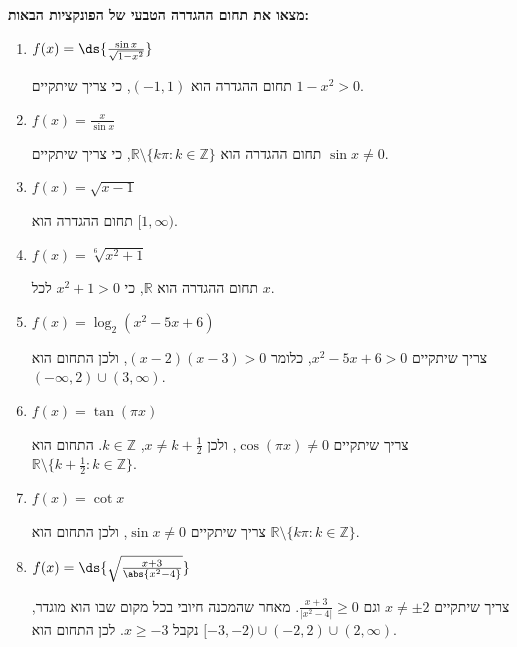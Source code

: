 \textbf{מצאו את תחום ההגדרה הטבעי של הפונקציות הבאות:}
\begin{enumerate}
\item  $f(x)=\ds{\frac{\sin x}{\sqrt{1-x^2}}}$
\begin{solbox}
תחום ההגדרה הוא $(-1,1)$, כי צריך שיתקיים
$1-x^2>0$.
\end{solbox}

\item $f(x)=\frac{x}{\sin x}$
\begin{solbox}
תחום ההגדרה הוא $\mathbb{R}\setminus\{k\pi:k\in\mathbb{Z}\}$,
כי צריך שיתקיים
$\sin x\neq0$.
\end{solbox}

\item $f(x)=\sqrt{x-1}$
\begin{solbox}
תחום ההגדרה הוא $[1,\infty)$.
\end{solbox}

\item $f(x)=\sqrt[6]{x^2+1}$
\begin{solbox}
תחום ההגדרה הוא $\mathbb{R}$, כי $x^2+1>0$ לכל $x$.
\end{solbox}
\item $f(x)=\log_2{(x^2-5x+6)}$
\begin{solbox}
צריך שיתקיים $x^2-5x+6>0$, כלומר $(x-2)(x-3)>0$, ולכן התחום הוא $(-\infty,2)\cup(3,\infty)$.
\end{solbox}

\item $f(x)=\tan(\pi x)$
\begin{solbox}
צריך שיתקיים $\cos(\pi x)\neq0$, ולכן $x\neq k+\frac12$, $k\in\mathbb{Z}$. התחום הוא $\mathbb{R}\setminus\{k+\frac12:k\in\mathbb{Z}\}$.
\end{solbox}

\item $f(x)=\cot x$
\begin{solbox}
צריך שיתקיים $\sin x\neq0$, ולכן התחום הוא $\mathbb{R}\setminus\{k\pi:k\in\mathbb{Z}\}$.
\end{solbox}

\item $f(x)=\ds{\sqrt{\frac{x+3}{\abs{x^2-4}}}}$
\begin{solbox}
צריך שיתקיים $x\neq\pm2$ וגם $\frac{x+3}{|x^2-4|}\geq0$. מאחר שהמכנה חיובי בכל מקום שבו הוא מוגדר, נקבל $x\geq-3$. לכן התחום הוא
$[-3,-2)\cup(-2,2)\cup(2,\infty)$.
\end{solbox}
\eMs
\end{enumerate}
